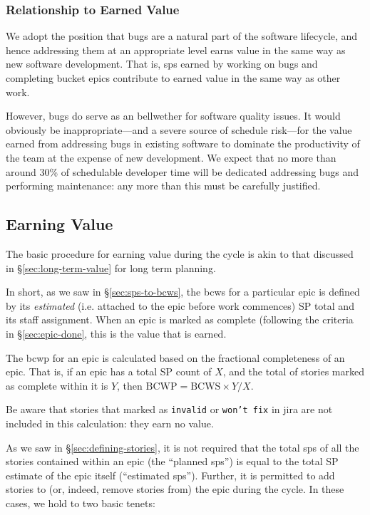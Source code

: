 \subsubsection{Relationship to Earned Value}

We adopt the position that bugs are a natural part of the software
lifecycle, and hence addressing them at an appropriate level earns value
in the same way as new software development. That is, \glspl{sp} earned by
working on bugs and completing bucket \glspl{epic} contribute to earned value
in the same way as other work.

However, bugs do serve as an bellwether for software quality issues.
It would obviously be inappropriate---and a severe source of schedule \gls{risk}---for the value earned from addressing bugs in existing software to dominate the productivity of the team at the expense of new development.
We expect that no more than around 30\% of schedulable developer time will be dedicated addressing bugs and performing maintenance: any more than this must be carefully justified.

\subsection{Earning Value}
\label{sec:cycle-value}

The basic procedure for earning value during the \gls{cycle} is akin to that discussed in \S\ref{sec:long-term-value} for long term planning.

In short, as we saw in \S\ref{sec:sps-to-bcws}, the \gls{bcws} for a particular \gls{epic} is defined by its \emph{estimated} (i.e.  attached to the \gls{epic} before work commences) SP total and its staff assignment.
When an \gls{epic} is marked as complete (following the criteria in \S\ref{sec:epic-done}, this is the value that is earned.

The \gls{bcwp} for an \gls{epic} is calculated based on the fractional completeness of an \gls{epic}. That is, if an \gls{epic} has a total SP count of \(X\), and the total of stories marked as complete within it is \(Y\), then \(\mathrm{BCWP} = \mathrm{BCWS} \times Y / X\).

Be aware that stories that marked as \texttt{invalid} or \texttt{won't fix} in \gls{jira} are not included in this calculation: they earn no value.

As we saw in \S\ref{sec:defining-stories}, it is not required that the total \glspl{sp} of all the stories contained within an \gls{epic} (the ``planned \glspl{sp}'') is equal to the total SP estimate of the \gls{epic} itself (``estimated \glspl{sp}''). Further, it is permitted to add stories to (or, indeed, remove stories from) the \gls{epic} during the \gls{cycle}. In these cases, we hold to two basic tenets:

